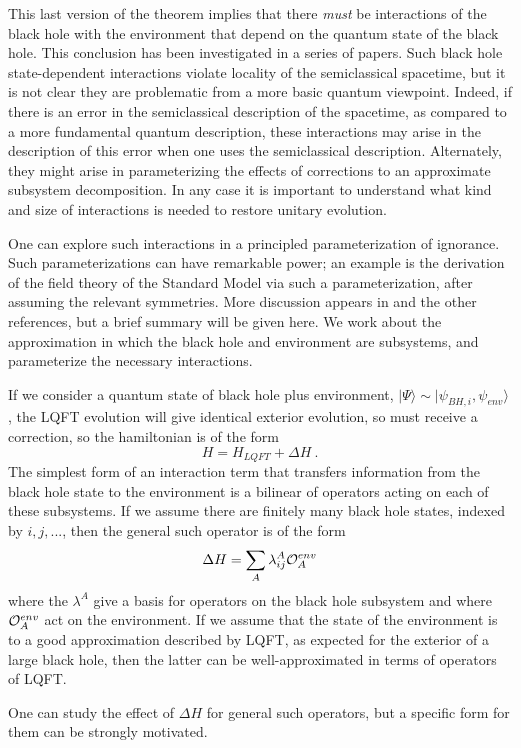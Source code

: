 \documentclass[12pt]{article}
\numberwithin{equation}{section}
\newcommand{\calo}{{\cal O}}
\newcommand{\beq}{\begin{equation}}
\newcommand{\eeq}{\end{equation}}
\begin{document}
This last version of the theorem implies that there {\it must} be interactions of the black hole with the environment that depend on the quantum state of the black hole.  This conclusion has been investigated in a series of papers\cite{SGmodels,BHQIUE,GiSh1,NVNL,NVUEFT,GiSh2,NVNLT,SGObs,NVU}.  Such black hole state-dependent interactions violate locality of the semiclassical spacetime, but it is not clear they are problematic from a more basic quantum viewpoint.  Indeed, if there is an error in the semiclassical description of the spacetime, as compared to a more fundamental quantum description, these interactions may arise in the description of this error when one uses the semiclassical description.  Alternately, they might arise in parameterizing the effects of corrections to an approximate subsystem decomposition.  In any case it is important to understand what kind and size of interactions is needed to restore unitary evolution.

One can explore such interactions in a principled parameterization of ignorance.  Such parameterizations can have remarkable power; an example is the derivation of the field theory of the Standard Model via such a parameterization, after assuming the relevant symmetries.  More discussion appears in \cite{BHQU} and the other references, but a brief summary will be given here.  We work about the approximation in which the black hole and environment are subsystems, and parameterize the necessary interactions.

If we consider a quantum state of black hole plus environment, $|\Psi\rangle \sim |\psi_{BH,i},\psi_{env}\rangle$, the LQFT evolution will give identical exterior evolution, so must receive a correction, so the hamiltonian is of the form
\beq
H=H_{LQFT} + \Delta H\ .
\eeq
 The simplest form of an interaction term that transfers information from the black hole state to the environment is a bilinear of operators acting on each of these subsystems.   If we assume there are finitely many black hole states, indexed by $i,j,...$, then the general such operator is of the form
 \beq
 \Delta H = \sum_A \lambda^A_{ij} {\cal O}^{env}_A
 \eeq
 where the $\lambda^A$ give a basis for operators on the black hole subsystem and where $\calo_A^{env}$ act on the environment.  If we assume that the state of the environment is to a good approximation described by LQFT, as expected for the exterior of a large black hole, then the latter can be well-approximated in terms of operators of LQFT.

One can study the effect of $\Delta H$ for general such operators\cite{NVUEFT,GiSh2}, but a specific form for them can be strongly motivated.  
\end{document}
